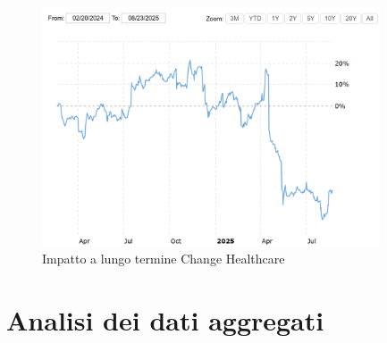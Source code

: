 \documentclass[12pt,a4paper,twoside]{report}
\begin{document}
\begin{figure}[H] 
\begin{center} 
\includegraphics[width=10cm]{figures/chHealth_long.png} 
\caption[Grafico Change Healthcare long]{Impatto a lungo termine  Change Healthcare}\label{fig:chh2}
\end{center}
\end{figure}






\chapter{Analisi dei dati aggregati}\label{chap:analisys}
\end{document}

